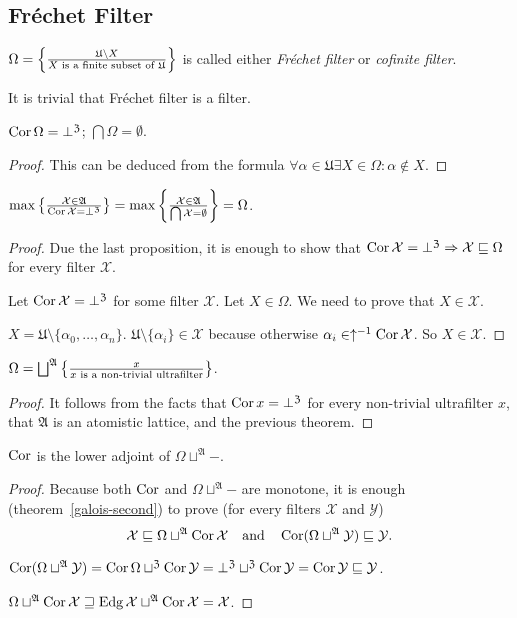 \subsection{Fr\'echet Filter}
\begin{defn}
$\Omega=\left\{ \frac{\mathfrak{U}\setminus X}{X\text{ is a finite subset of }\mathfrak{U}}\right\}$
is called either \emph{Fr\'echet filter} or \emph{cofinite filter}.
\end{defn}
It is trivial that Fr\'echet filter is a filter.
\begin{prop}
$\operatorname{Cor}\Omega=\bot^{\mathfrak{Z}}$; $\bigcap\Omega=\emptyset$.\end{prop}
\begin{proof}
This can be deduced from the formula $\forall\alpha\in\mathfrak{U}\exists X\in\Omega:\alpha\notin X$.\end{proof}
\begin{thm}
$\max\left\{ \frac{\mathcal{X}\in\mathfrak{A}}{\operatorname{Cor}\mathcal{X}=\bot^{\mathfrak{Z}}}\right\}=\max\left\{ \frac{\mathcal{X}\in\mathfrak{A}}{\bigcap\mathcal{X}=\emptyset}\right\}=\Omega$.\end{thm}
\begin{proof}
Due the last proposition, it is enough to show that $\operatorname{Cor}\mathcal{X}=\bot^{\mathfrak{Z}}\Rightarrow\mathcal{X}\sqsubseteq\Omega$
for every filter $\mathcal{X}$.

Let $\operatorname{Cor}\mathcal{X}=\bot^{\mathfrak{Z}}$ for some filter $\mathcal{X}$.
Let $X\in\Omega$. We need to prove that $X\in\mathcal{X}$.

$X=\mathfrak{U}\setminus\{\alpha_{0},\dots,\alpha_{n}\}$. $\mathfrak{U}\setminus\{\alpha_{i}\}\in\mathcal{X}$
because otherwise $\alpha_{i}\in\uparrow^{-1}\operatorname{Cor}\mathcal{X}$. So
$X\in\mathcal{X}$.\end{proof}
\begin{thm}
$\Omega=\bigsqcup^{\mathfrak{A}}\left\{ \frac{x}{x\text{ is a non-trivial ultrafilter}}\right\}$.\end{thm}
\begin{proof}
It follows from the facts that $\operatorname{Cor} x=\bot^{\mathfrak{Z}}$ for every
non-trivial ultrafilter $x$, that $\mathfrak{A}$ is an atomistic
lattice, and the previous theorem.\end{proof}
\begin{thm}
$\operatorname{Cor}$ is the lower adjoint of $\Omega\sqcup^{\mathfrak{A}}\mathord-$.\end{thm}
\begin{proof}
Because both $\operatorname{Cor}$ and $\Omega\sqcup^{\mathfrak{A}}\mathord-$ are
monotone, it is enough (theorem~\ref{galois-second}) to prove (for
every filters $\mathcal{X}$ and $\mathcal{Y}$)
\[
\mathcal{X}\sqsubseteq\Omega\sqcup^{\mathfrak{A}}\operatorname{Cor}\mathcal{X}\quad\text{and}\quad\operatorname{Cor}(\Omega\sqcup^{\mathfrak{A}}\mathcal{Y})\sqsubseteq\mathcal{Y}.
\]

$\operatorname{Cor}(\Omega\sqcup^{\mathfrak{A}}\mathcal{Y})=\operatorname{Cor}\Omega\sqcup^{\mathfrak{Z}}\operatorname{Cor}\mathcal{Y}=\bot^{\mathfrak{Z}}\sqcup^{\mathfrak{Z}}\operatorname{Cor}\mathcal{Y}=\operatorname{Cor}\mathcal{Y}\sqsubseteq\mathcal{Y}$.

$\Omega\sqcup^{\mathfrak{A}}\operatorname{Cor}\mathcal{X}\sqsupseteq\operatorname{Edg}\mathcal{X}\sqcup^{\mathfrak{A}}\operatorname{Cor}\mathcal{X}=\mathcal{X}$.
\end{proof}
